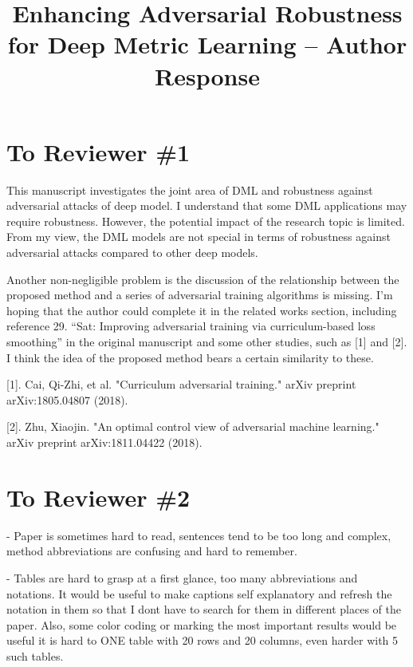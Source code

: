 \documentclass[10pt,twocolumn,letterpaper]{article}
\begin{document}
\title{Enhancing Adversarial Robustness for Deep Metric Learning -- Author Response}  %

\maketitle
\thispagestyle{empty}
\appendix

\section{To Reviewer \#1}

This manuscript investigates the joint area of DML and robustness against adversarial attacks of deep model. I understand that some DML applications may require robustness. However, the potential impact of the research topic is limited. From my view, the DML models are not special in terms of robustness against adversarial attacks compared to other deep models.

Another non-negligible problem is the discussion of the relationship between the proposed method and a series of adversarial training algorithms is missing. I’m hoping that the author could complete it in the related works section, including reference 29. “Sat: Improving adversarial training via curriculum-based loss smoothing” in the original manuscript and some other studies, such as [1] and [2]. I think the idea of the proposed method bears a certain similarity to these.

[1]. Cai, Qi-Zhi, et al. "Curriculum adversarial training." arXiv preprint arXiv:1805.04807 (2018).

[2]. Zhu, Xiaojin. "An optimal control view of adversarial machine learning." arXiv preprint arXiv:1811.04422 (2018).

\section{To Reviewer \#2}

- Paper is sometimes hard to read, sentences tend to be too long and complex, method abbreviations are confusing and hard to remember.

- Tables are hard to grasp at a first glance, too many abbreviations and notations. It would be useful to make captions self explanatory and refresh the notation in them so that I dont have to search for them in different places of the paper. Also, some color coding or marking the most important results would be useful it is hard to ONE table with 20 rows and 20 columns, even harder with 5 such tables.
\end{document}
